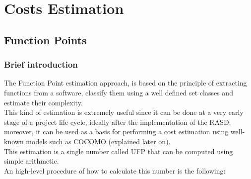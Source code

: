 \newpage
\def\arraystretch{1.15}
\section{Costs Estimation}
\subsection{Function Points}
\subsubsection{Brief introduction}
The Function Point estimation approach, is based on the principle of extracting functions from a software, classify them using a well defined set classes and estimate their complexity. \\ This kind of estimation is extremely useful since it can be done at a very early stage of a project life-cycle, ideally after the implementation of the RASD, moreover, it can be used as a basis for performing a cost estimation using well-known models such as COCOMO (explained later on). \\
This estimation is a single number called UFP that can be computed using simple arithmetic. \\
An high-level procedure of how to calculate this number is the following:
